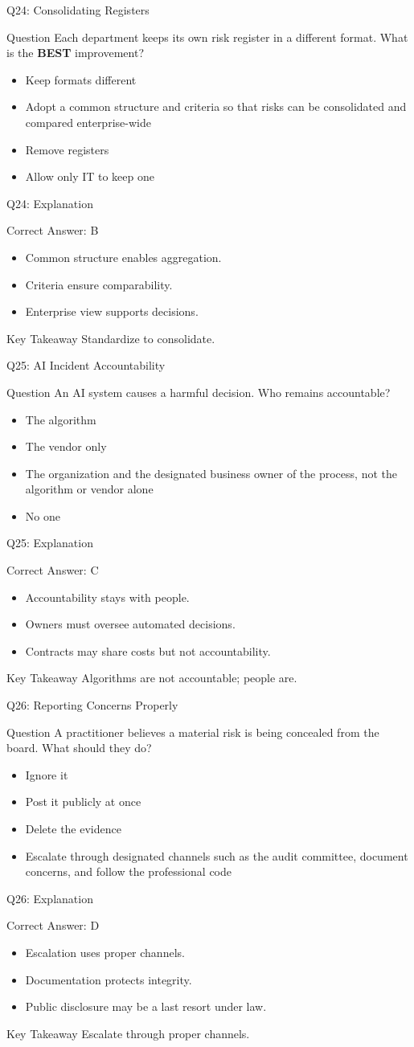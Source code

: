 \documentclass[aspectratio=169]{beamer}
\newcommand{\hq}[7]{%
	\begin{frame}{Q#1: #2}
		\begin{block}{Question}
			#3
		\end{block}
		\begin{itemize}
			#4
		\end{itemize}
	\end{frame}
	\begin{frame}{Q#1: Explanation}
		\begin{block}{Correct Answer: #5}
			\begin{itemize}
				#6
			\end{itemize}
		\end{block}
		\begin{alertblock}{Key Takeaway}
			#7
		\end{alertblock}
	\end{frame}
}
\begin{document}
	\hq{24}{Consolidating Registers}
	{Each department keeps its own risk register in a different format. What is the \textbf{BEST} improvement?}
	{\item[\textbf{(A)}] Keep formats different
		\item[\textbf{(B)}] Adopt a common structure and criteria so that risks can be consolidated and compared enterprise-wide
		\item[\textbf{(C)}] Remove registers
		\item[\textbf{(D)}] Allow only IT to keep one}
	{B}
	{\item Common structure enables aggregation.
		\item Criteria ensure comparability.
		\item Enterprise view supports decisions.}
	{Standardize to consolidate.}

	\hq{25}{AI Incident Accountability}
	{An AI system causes a harmful decision. Who remains accountable?}
	{\item[\textbf{(A)}] The algorithm
		\item[\textbf{(B)}] The vendor only
		\item[\textbf{(C)}] The organization and the designated business owner of the process, not the algorithm or vendor alone
		\item[\textbf{(D)}] No one}
	{C}
	{\item Accountability stays with people.
		\item Owners must oversee automated decisions.
		\item Contracts may share costs but not accountability.}
	{Algorithms are not accountable; people are.}

	\hq{26}{Reporting Concerns Properly}
	{A practitioner believes a material risk is being concealed from the board. What should they do?}
	{\item[\textbf{(A)}] Ignore it
		\item[\textbf{(B)}] Post it publicly at once
		\item[\textbf{(C)}] Delete the evidence
		\item[\textbf{(D)}] Escalate through designated channels such as the audit committee, document concerns, and follow the professional code}
	{D}
	{\item Escalation uses proper channels.
		\item Documentation protects integrity.
		\item Public disclosure may be a last resort under law.}
	{Escalate through proper channels.}
\end{document}
